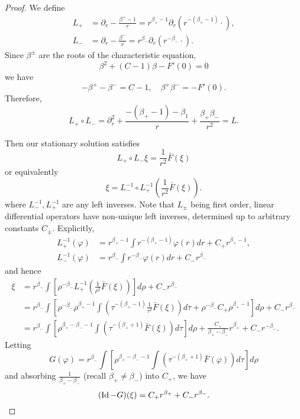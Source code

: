 \documentclass{amsart}
\begin{document}
\begin{proof}
We define
\begin{align*}
L_+ &= \partial_r - \frac{\beta^+ - 1}{r} = r^{\beta_+ - 1} \partial_r (r^{-(\beta_+ - 1)} \cdot) , \\
L_- &= \partial_r - \frac{\beta^-}{r} = r^{\beta_-} \partial_r (r^{-\beta_-} \cdot).
\end{align*}
Since \(\beta^{\pm}\) are the roots of the characteristic equation,
\[
\beta^2 + (C - 1) \beta - F'(0) = 0
\]
we have
\[
- \beta^+ - \beta^- = C-1, \quad \beta^+ \beta^- = -F'(0).
\]
Therefore,
\[
L_+ \circ L_- = \partial_r^2 + \frac{-(\beta_+ - 1) -\beta_1}{r} + \frac{\beta_+ \beta_-}{r^2} = L.
\]

Then our stationary solution satisfies
\[
L_+ \circ L_- \xi = \frac{1}{r^2} \bar{F}(\xi)
\]
or equivalently
\[
\xi = L_-^{-1} \circ L_+^{-1} \left(\frac{1}{r^2} \bar{F}(\xi)\right).
\]
where \(L_-^{-1}, L_+^{-1}\) are any left inverses. Note that \(L_{\pm}\) being first order, linear differential operators have non-unique left inverses, determined up to arbitrary constants \(C_{\pm}\). Explicitly,
\begin{align*}
L_+^{-1} (\varphi) &= r^{\beta_+ - 1} \int r^{-(\beta_+ - 1)} \varphi(r) dr + C_+ r^{\beta_+-1}, \\
L_-^{-1} (\varphi) &= r^{\beta_-} \int r^{-\beta_-} \varphi(r) dr + C_- r^{\beta_-}
\end{align*}
and hence
\begin{equation}
\label{eq:}
\begin{split}
\xi &= r^{\beta_-} \int \left[\rho^{-\beta_-} L_+^{-1} \left(\frac{1}{\rho^2} \bar{F}(\xi)\right)\right] d\rho + C_- r^{\beta_-} \\
&= r^{\beta_-} \int \left[\rho^{-\beta_-} \rho^{\beta_+ - 1} \int \left(\tau^{-(\beta_+ - 1)} \frac{1}{\tau^2} \bar{F}(\xi) \right)d\tau + \rho^{-\beta_-} C_+ \rho^{\beta_+-1}\right] d\rho + C_- r^{\beta_-} \\
&= r^{\beta_-} \int \left[\rho^{\beta_+ - \beta_- - 1} \int \left(\tau^{-(\beta_+ + 1)} \bar{F}(\xi) \right)d\tau\right] d\rho + \frac{C_+}{\beta_+ - \beta_-} r^{\beta_+} + C_- r^{-\beta_-}.
\end{split}
\end{equation}
Letting
\[
G(\varphi) = r^{\beta_-} \int \left[\rho^{\beta_+ - \beta_- - 1} \int \left(\tau^{-(\beta_+ + 1)} \bar{F}(\varphi) \right)d\tau\right] d\rho
\]
and absorbing \(\tfrac{1}{\beta_+ - \beta_-}\) (recall \(\beta_+ \ne \beta_-\)) into \(C_+\), we have
\[
(\operatorname{Id} - G) (\xi) = C_+ r^{\beta_+} + C_- r^{\beta_-}.
\]


\end{proof}
\end{document}
